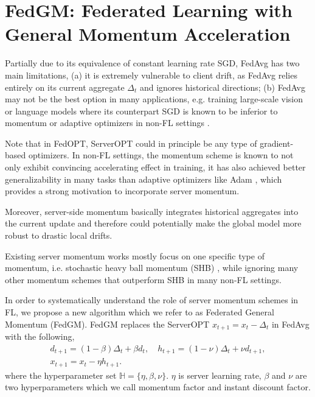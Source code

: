 \section{FedGM: Federated Learning with General Momentum Acceleration}
\label{sec:fedgm}

Partially due to its equivalence of constant learning rate SGD, FedAvg has two main limitations, (a) it is extremely vulnerable to client drift, as FedAvg relies entirely on its current aggregate $\Delta_t$ and ignores historical directions; (b) FedAvg may not be the best option in many applications, e.g. training large-scale vision or language models \citep{devlin2018bert,dosovitskiy2021VIT} where its counterpart SGD is known to be inferior to momentum or adaptive optimizers in non-FL settings \citep{Wilson2017Generalization,Zhang20Adam_Attention}.

Note that in FedOPT, ServerOPT could in principle be any type of gradient-based optimizers. In non-FL settings, the momentum scheme is known to not only exhibit convincing accelerating effect in training, it has also achieved better generalizability in many tasks than adaptive optimizers like Adam \citep{Wilson2017Generalization,Cutkosky2020MomentumIN}, which provides a strong motivation to incorporate server momentum.

Moreover, server-side momentum basically integrates historical aggregates into the current update and therefore could potentially make the global model more robust to drastic local drifts.

Existing server momentum works mostly focus on one specific type of momentum, i.e. stochastic heavy ball momentum (SHB) \citep{Hsu2019MeasuringTE,rothchild20fetchsgd,khanduri2021stem}, while ignoring many other momentum schemes that outperform SHB in many non-FL settings.

In order to systematically understand the role of server momentum schemes in FL, we propose a new algorithm which we refer to as Federated General Momentum (FedGM). FedGM replaces the ServerOPT $x_{t+1}=x_t-\Delta_t$ in FedAvg with the following,
\begin{equation}
\label{fedgm_formulation}
\begin{gathered}
d_{t+1}=(1-\beta)\Delta_{t}+\beta d_{t},\quad
h_{t+1}=(1-\nu)\Delta_{t}+\nu d_{t+1},\\
x_{t+1}=x_t-\eta h_{t+1}.
\end{gathered}
\end{equation}
where the hyperparameter set $\mathbb{H}=\{\eta,\beta,\nu\}$. $\eta$ is server learning rate, $\beta$ and $\nu$ are two hyperparameters which we call momentum factor and instant discount factor. 

